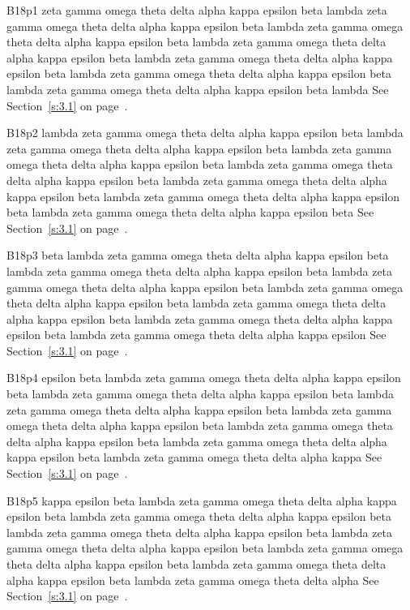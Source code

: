 B18p1 zeta gamma omega theta delta alpha kappa epsilon beta lambda zeta gamma omega theta delta alpha kappa epsilon beta lambda zeta gamma omega theta delta alpha kappa epsilon beta lambda zeta gamma omega theta delta alpha kappa epsilon beta lambda zeta gamma omega theta delta alpha kappa epsilon beta lambda zeta gamma omega theta delta alpha kappa epsilon beta lambda zeta gamma omega theta delta alpha kappa epsilon beta lambda See Section~\ref{s:3.1} on page~\pageref{s:3.1}.

B18p2 lambda zeta gamma omega theta delta alpha kappa epsilon beta lambda zeta gamma omega theta delta alpha kappa epsilon beta lambda zeta gamma omega theta delta alpha kappa epsilon beta lambda zeta gamma omega theta delta alpha kappa epsilon beta lambda zeta gamma omega theta delta alpha kappa epsilon beta lambda zeta gamma omega theta delta alpha kappa epsilon beta lambda zeta gamma omega theta delta alpha kappa epsilon beta See Section~\ref{s:3.1} on page~\pageref{s:3.1}.

B18p3 beta lambda zeta gamma omega theta delta alpha kappa epsilon beta lambda zeta gamma omega theta delta alpha kappa epsilon beta lambda zeta gamma omega theta delta alpha kappa epsilon beta lambda zeta gamma omega theta delta alpha kappa epsilon beta lambda zeta gamma omega theta delta alpha kappa epsilon beta lambda zeta gamma omega theta delta alpha kappa epsilon beta lambda zeta gamma omega theta delta alpha kappa epsilon See Section~\ref{s:3.1} on page~\pageref{s:3.1}.

B18p4 epsilon beta lambda zeta gamma omega theta delta alpha kappa epsilon beta lambda zeta gamma omega theta delta alpha kappa epsilon beta lambda zeta gamma omega theta delta alpha kappa epsilon beta lambda zeta gamma omega theta delta alpha kappa epsilon beta lambda zeta gamma omega theta delta alpha kappa epsilon beta lambda zeta gamma omega theta delta alpha kappa epsilon beta lambda zeta gamma omega theta delta alpha kappa See Section~\ref{s:3.1} on page~\pageref{s:3.1}.

B18p5 kappa epsilon beta lambda zeta gamma omega theta delta alpha kappa epsilon beta lambda zeta gamma omega theta delta alpha kappa epsilon beta lambda zeta gamma omega theta delta alpha kappa epsilon beta lambda zeta gamma omega theta delta alpha kappa epsilon beta lambda zeta gamma omega theta delta alpha kappa epsilon beta lambda zeta gamma omega theta delta alpha kappa epsilon beta lambda zeta gamma omega theta delta alpha See Section~\ref{s:3.1} on page~\pageref{s:3.1}.


